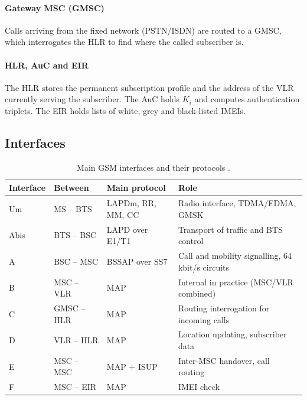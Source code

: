 \documentclass[11pt,a4paper]{article}
\begin{document}
\paragraph{Gateway MSC (GMSC)} Calls arriving from the fixed network (PSTN/ISDN) are
routed to a GMSC, which interrogates the HLR to find where the called subscriber is.

\paragraph{HLR, AuC and EIR} The HLR stores the permanent subscription profile and the
address of the VLR currently serving the subscriber. The AuC holds $K_i$ and computes
authentication triplets. The EIR holds lists of white, grey and black-listed IMEIs.

\subsection{Interfaces}
\begin{table}[htbp]
\centering\small
\caption{Main GSM interfaces and their protocols \cite{ts23002}.}\label{tab:interfaces}
\begin{tabularx}{\linewidth}{@{}l l l Y@{}}
\toprule
{}Interface & Between & Main protocol & Role \\
\midrule
Um   & MS -- BTS        & LAPDm, RR, MM, CC      & Radio interface, TDMA/FDMA, GMSK \\
Abis & BTS -- BSC       & LAPD over E1/T1        & Transport of traffic and BTS control \\
A    & BSC -- MSC       & BSSAP over SS7         & Call and mobility signalling, 64\,kbit/s circuits \\
B    & MSC -- VLR       & MAP                    & Internal in practice (MSC/VLR combined) \\
C    & GMSC -- HLR      & MAP                    & Routing interrogation for incoming calls \\
D    & VLR -- HLR       & MAP                    & Location updating, subscriber data \\
E    & MSC -- MSC       & MAP + ISUP             & Inter-MSC handover, call routing \\
F    & MSC -- EIR       & MAP                    & IMEI check \\
\bottomrule
\end{tabularx}
\end{table}
\end{document}

